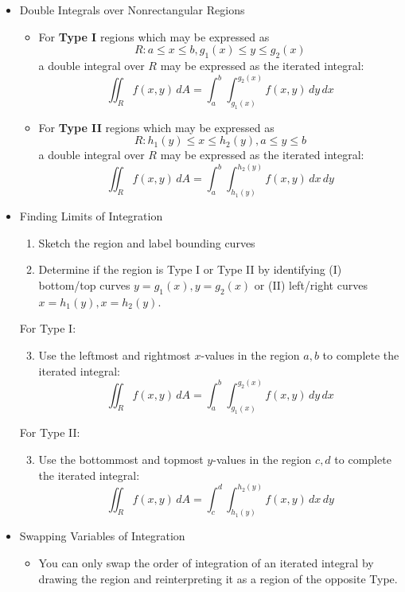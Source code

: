 \documentclass[12pt]{article}
\newcommand{\dvar}[1]{\,d{#1}}
\renewcommand{\d}[1]{\dvar{#1}}
\newcommand{\<}{\left<}
\renewcommand{\>}{\right>}
\begin{document}
  \begin{itemize}
  
  \item Double Integrals over Nonrectangular Regions
  
    \begin{itemize}
    \item For \textbf{Type I} regions which may be expressed as \[R: a\leq x\leq b, g_1(x)\leq y\leq g_2(x)\] a double integral over $R$ may be expressed as the iterated integral:
      \[
        \iint_R f(x,y)\d{A} = \int_a^b\int_{g_1(x)}^{g_2(x)} f(x,y)\d{y}\d{x}
      \]
    \item For \textbf{Type II} regions which may be expressed as \[R: h_1(y)\leq x\leq h_2(y), a\leq y\leq b\] a double integral over $R$ may be expressed as the iterated integral:
      \[
        \iint_R f(x,y)\d{A} = \int_a^b\int_{h_1(y)}^{h_2(y)} f(x,y)\d{x}\d{y}
      \]
    \end{itemize}

  \item Finding Limits of Integration
      \begin{enumerate}
      \item Sketch the region and label bounding curves
      \item Determine if the region is Type I or Type II by identifying (I) bottom/top curves $y=g_1(x),y=g_2(x)$ or (II) left/right curves $x=h_1(y),x=h_2(y)$.
      \end{enumerate}
      For Type I:
      \begin{enumerate}
      \setcounter{enumi}{2}
      \item Use the leftmost and rightmost $x$-values in the region $a,b$ to complete the iterated integral:
        \[
          \iint_R f(x,y)\d{A} = \int_a^b\int_{g_1(x)}^{g_2(x)}f(x,y)\d{y}\d{x}
        \]
      \end{enumerate}
      For Type II:
      \begin{enumerate}
      \setcounter{enumi}{2}
      \item Use the bottommost and topmost $y$-values in the region $c,d$ to complete the iterated integral:
        \[
          \iint_R f(x,y)\d{A} = \int_c^d\int_{h_1(y)}^{h_2(y)}f(x,y)\d{x}\d{y}
        \]
      \end{enumerate}
  
  \item Swapping Variables of Integration
  
    \begin{itemize}
    \item You can only swap the order of integration of an iterated integral by drawing the region and reinterpreting it as a region of the opposite Type.
    \end{itemize}


\end{itemize}
\end{document}
